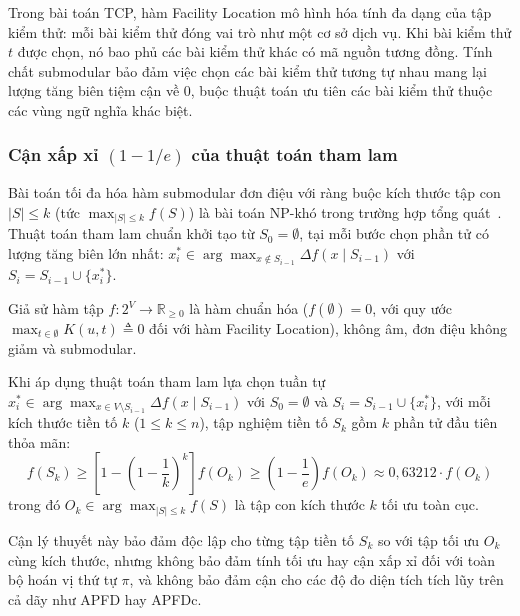 Trong bài toán TCP, hàm Facility Location mô hình hóa tính đa dạng của tập kiểm thử: mỗi bài kiểm thử đóng vai trò như một cơ sở dịch vụ. Khi bài kiểm thử $t$ được chọn, nó bao phủ các bài kiểm thử khác có mã nguồn tương đồng. Tính chất submodular bảo đảm việc chọn các bài kiểm thử tương tự nhau mang lại lượng tăng biên tiệm cận về 0, buộc thuật toán ưu tiên các bài kiểm thử thuộc các vùng ngữ nghĩa khác biệt.

\subsubsection{Cận xấp xỉ \texorpdfstring{$(1 - 1/e)$}{(1 - 1/e)} của thuật toán tham lam}
\label{subsubsec:nemhauser_greedy_bound}

Bài toán tối đa hóa hàm submodular đơn điệu với ràng buộc kích thước tập con $|S| \le k$ (tức $\max_{|S| \le k} f(S)$) là bài toán NP-khó trong trường hợp tổng quát~\cite{nemhauser1978analysis, krause2014submodular}. Thuật toán tham lam chuẩn khởi tạo từ $S_0 = \emptyset$, tại mỗi bước chọn phần tử có lượng tăng biên lớn nhất: $x_i^* \in \arg\max_{x \notin S_{i-1}} \Delta f(x \mid S_{i-1})$ với $S_i = S_{i-1} \cup \{x_i^*\}$.

\begin{dl}
\label{dl:nemhauser_theorem}
Giả sử hàm tập $f: 2^V \to \mathbb{R}_{\ge 0}$ là hàm chuẩn hóa ($f(\emptyset) = 0$, với quy ước $\max_{t \in \emptyset} K(u, t) \triangleq 0$ đối với hàm Facility Location), không âm, đơn điệu không giảm và submodular.

Khi áp dụng thuật toán tham lam lựa chọn tuần tự $x_i^* \in \arg\max_{x \in V \setminus S_{i-1}} \Delta f(x \mid S_{i-1})$ với $S_0 = \emptyset$ và $S_i = S_{i-1} \cup \{x_i^*\}$, với mỗi kích thước tiền tố $k$ ($1 \le k \le n$), tập nghiệm tiền tố $S_k$ gồm $k$ phần tử đầu tiên thỏa mãn:
\begin{equation}
\label{eq:nemhauser_bound_formula}
f(S_k) \ge \left[ 1 - \left(1 - \frac{1}{k}\right)^k \right] f(O_k) \ge \left(1 - \frac{1}{e}\right) f(O_k) \approx 0{,}63212 \cdot f(O_k)
\end{equation}
trong đó $O_k \in \arg\max_{|S| \le k} f(S)$ là tập con kích thước $k$ tối ưu toàn cục.

Cận lý thuyết này bảo đảm độc lập cho từng tập tiền tố $S_k$ so với tập tối ưu $O_k$ cùng kích thước, nhưng không bảo đảm tính tối ưu hay cận xấp xỉ đối với toàn bộ hoán vị thứ tự $\pi$, và không bảo đảm cận cho các độ đo diện tích tích lũy trên cả dãy như APFD hay APFDc.
\end{dl}

